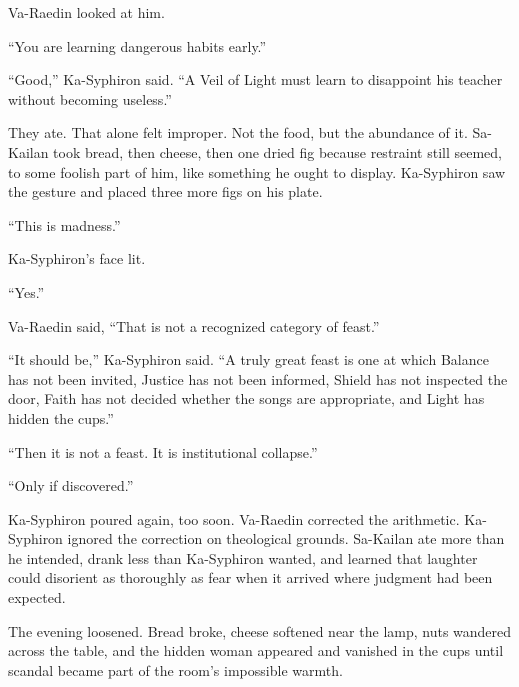 Va-Raedin looked at him.\par

“You are learning dangerous habits early.”\par

“Good,” Ka-Syphiron said.
“A Veil of Light must learn to disappoint his teacher without becoming useless.”\par

They ate.
That alone felt improper.
Not the food, but the abundance of it.
Sa-Kailan took bread, then cheese, then one dried fig because restraint still seemed, to some foolish part of him, like something he ought to display.
Ka-Syphiron saw the gesture and placed three more figs on his plate.\par

“This is madness.”\par

Ka-Syphiron’s face lit.\par

“Yes.”\par

Va-Raedin said, “That is not a recognized category of feast.”\par

“It should be,” Ka-Syphiron said.
“A truly great feast is one at which Balance has not been invited, Justice has not been informed, Shield has not inspected the door, Faith has not decided whether the songs are appropriate, and Light has hidden the cups.”\par

“Then it is not a feast.
It is institutional collapse.”\par

“Only if discovered.”\par




Ka-Syphiron poured again, too soon.
Va-Raedin corrected the arithmetic.
Ka-Syphiron ignored the correction on theological grounds.
Sa-Kailan ate more than he intended, drank less than Ka-Syphiron wanted, and learned that laughter could disorient as thoroughly as fear when it arrived where judgment had been expected.\par

The evening loosened.
Bread broke, cheese softened near the lamp, nuts wandered across the table, and the hidden woman appeared and vanished in the cups until scandal became part of the room’s impossible warmth.\par

